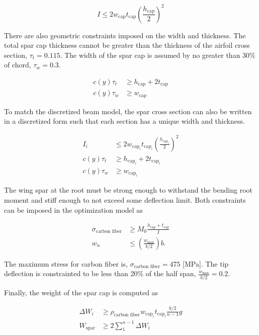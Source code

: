 \documentclass[]{aiaa-tc}%
\begin{document}
\begin{equation}
    \label{e:moispar}
    I \leq 2w_{\text{cap}}t_{\text{cap}}\left(\frac{h_{\text{cap}}}{2}\right)^2
\end{equation}

There are also geometric constraints imposed on the width and thickness.  The total spar cap thickness cannot be greater than the thickness of the airfoil cross section, $\tau_t = 0.115$.  The width of the spar cap is assumed by no greater than 30\% of chord, $\tau_w = 0.3$.

\begin{align}
    \label{e:thickness}
    c(y)\tau_t &\geq h_{\text{cap}} + 2t_{\text{cap}} \\
    \label{e:width}
    c(y)\tau_w &\geq w_{\text{cap}} 
    \end{align}

To match the discretized beam model, the spar cross section can also be written in a discretized form such that each section has a unique width and thickness. 

\begin{align}
    I_i &\leq 2w_{\text{cap}_i}t_{\text{cap}_i}\left(\frac{h_{\text{cap}_i}}{2}\right)^2 \\
    c(y)\tau_t &\geq h_{\text{cap}_i} + 2t_{\text{cap}_i} \\
    c(y)\tau_w &\geq w_{\text{cap}_i} 
\end{align}

The wing spar at the root must be strong enough to withstand the bending root moment and stiff enough to not exceed some deflection limit.  Both constraints can be imposed in the optimization model as

\begin{align}
    \label{e:stresscont}
    \sigma_{\text{carbon fiber}} &\geq M_0 \frac{h_{\text{cap}}+t_{\text{cap}}}{I}\\
    \label{e:defcont}
    w_n &\leq \left(\frac{w_{\text{max}}}{b/2} \right) b.
\end{align}

The maximum stress for carbon fiber is, $\sigma_{\text{carbon fiber}} = 475$ [MPa]. 
The tip deflection is constrainted to be less than 20\% of the half span, $\frac{w_{\text{max}}}{b/2} = 0.2$.

Finally, the weight of the spar cap is computed as

\begin{align}
    \label{e:sparmass}
    \Delta W_i &\geq \rho_{\text{carbon fiber}} w_{\text{cap}_i}t_{\text{cap}_i} \frac{b/2}{n-1}g \\
    \label{e:sparmasssum}
    W_{\text{spar}} &\geq 2 \sum\limits_{1}^{n-1} \Delta W_i
\end{align}
\end{document}
